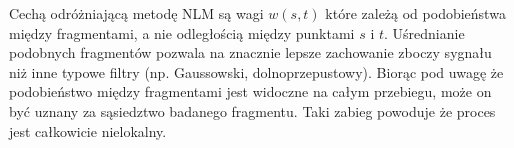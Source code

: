 Cechą odróżniającą metodę NLM są wagi $w(s,t)$ które zależą od podobieństwa między fragmentami, a nie odległością między punktami $s$ i $t$. Uśrednianie podobnych fragmentów pozwala na znacznie lepsze  zachowanie zboczy sygnału niż inne typowe filtry (np. Gaussowski, dolnoprzepustowy).  Biorąc pod uwagę że podobieństwo między fragmentami jest widoczne na całym przebiegu, może on być uznany za sąsiedztwo badanego fragmentu. Taki zabieg powoduje że proces jest całkowicie nielokalny.\cite{tracey2012nonlocal}

